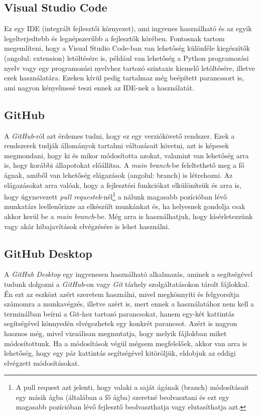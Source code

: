 \documentclass[]{thesis-ekf}
\theoremstyle{definition}
\theoremstyle{remark}
\begin{document}
	\subsection{Visual Studio Code}
		Ez egy IDE (integrált fejlesztői környezet), ami ingyenes használható és az egyik legelterjedtebb és legnépszerűbb a fejlesztők körében. Fontosnak tartom megemlíteni, hogy a Visual Studio Code-ban van lehetőség különféle kiegészítők (angolul: extension) letöltésére is, például van lehetőség a Python programozási nyelv vagy egy programozási nyelvhez tartozó szintaxis kiemelő letöltésére, illetve ezek használatára. Ezeken kívül pedig tartalmaz még beépített parancssort is, ami nagyon kényelmesé teszi ennek az IDE-nek a használatát. 
	\subsection{GitHub}
		A \emph{GitHub}-ról azt érdemes tudni, hogy ez egy verziókövető rendszer. Ezek a rendszerek tudják állományok tartalmi változásait követni, azt is képesek megmondani, hogy ki és mikor módosította azokat, valamint van lehetőség arra is, hogy korábbi állapotokat előállítsa. A \emph{main branch}-be feleltethető meg a fő ágnak, amiből van lehetőség elágazások (angolul: branch) is létrehozni. Az elágazásokat arra valóak, hogy a fejlesztési funkciókat elkülönítsük és arra is, hogy úgynevezett \emph{pull requestek}-nél\footnote{A pull request azt jelenti, hogy valaki a saját ágának (branch) módosításait egy másik ágba (általában a fő ágba) szeretné beolvasztani és ezt egy magasabb pozícióban lévő fejlesztő beolvaszthatja vagy elutasíthatja azt.} a nálunk magasabb pozícióban lévő munkatárs leellenőrizze az elkészült munkánkat és, ha helyesnek gondolja csak akkor kerül be a \emph{main branch}-be. Még arra is használhatjuk, hogy kísérletezzünk vagy akár hibajavítások elvégzésére is lehet használni.
	\subsection{GitHub Desktop}
		A \emph{GitHub Desktop} egy ingyenesen használható alkalmazás, aminek a segítségével tudunk dolgozni a \emph{GitHub}-on vagy \emph{Git} tárhely szolgáltatásokon tárolt fájlokkal. Én ezt az eszközt azért szeretem használni, mivel megkönnyíti és felgyorsítja számomra a munkavégzés, illetve azért is, mert ennek a használatához nem kell a terminálban beírni a Git-hez tartozó parancsokat, hanem egy-két kattintás segítségével könnyedén elvégezhetek egy konkrét parancsot. Azért is nagyon hasznos még, mivel vizuálisan megmutatja, hogy melyik fájlokban miket módosítottunk. Ha a módosítások végül mégsem megfelelőek, akkor van arra is lehetőség, hogy egy pár kattintás segítségével kitöröljük, eldobjuk az eddigi elvégzett módosításokat. \cite{GitHubDesktop}
\end{document}
